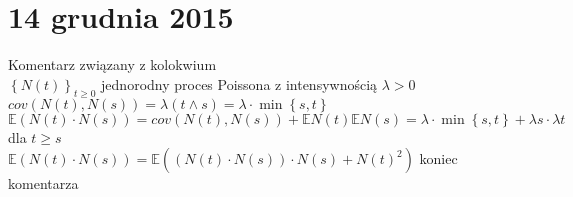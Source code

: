 \chapter{14 grudnia 2015}
Komentarz związany z kolokwium\\
$ \left\{N(t)\right\}_{t\ge 0} $ jednorodny proces Poissona z intensywnością $ \lambda>0 $\\
$ cov\left(N(t),N(s)\right)=\lambda\left(t\wedge s\right)=\lambda\cdot\min\left\{s,t\right\} $\\
$ \mathbb E \left(N(t)\cdot N(s)\right)=cov\left(N(t),N(s)\right)+\mathbb E N(t)\mathbb E N(s)=\lambda\cdot\min\left\{s,t\right\}+\lambda s\cdot\lambda t $
dla $ t \ge s $\\
$ \mathbb E \left(N(t)\cdot N(s)\right)=\mathbb E \left(\left(N(t)\cdot N(s)\right)\cdot N(s)+N(t)^2\right) $
koniec komentarza

